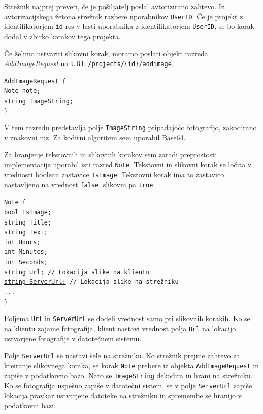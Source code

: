 \documentclass[a4paper, 12pt]{book}
\begin{document}
Strežnik najprej preveri, če je pošiljatelj poslal avtorizirano zahtevo.
Iz avtorizacijskega žetona strežnik razbere uporabnikov \texttt{UserID}. 
Če je projekt z identifikatorjem \texttt{id} res v lasti uporabnika z identifikatorjem \texttt{UserID}, se bo korak dodal v zbirko korakov tega projekta.

Če želimo ustvariti slikovni korak, moramo poslati objekt razreda \textit{AddImageRequest} na URL \texttt{/projects/\{id\}/addimage}.

\noindent \texttt{AddImageRequest \{ \\
Note note; \\
string ImageString;  \\
\} }

V tem razredu predstavlja polje \texttt{ImageString} pripadajočo fotografijo, zakodirano v znakovni niz.
Za kodirni algoritem sem uporabil Base64.

Za hranjenje tekstovnih in slikovnih korakov sem zaradi preprostosti implementacije uporabil isti razred \texttt{Note}.
Tekstovni in slikovni korak se ločita v vrednosti boolean zastavice \texttt{IsImage}.
Tekstovni korak ima to zastavico nastavljeno na vrednost \texttt{false}, slikovni pa \texttt{true}.

\noindent \texttt{Note \{ \\
\underline{bool IsImage;}  \\
string Title; \\
string Text; \\
int Hours; \\
int Minutes; \\
int Seconds; \\
\underline{string Url;} // Lokacija slike na klientu \\
\underline{string ServerUrl;} // Lokacija slike na strežniku \\
... \\
\}
}

Poljema \texttt{Url} in \texttt{ServerUrl} se dodeli vrednost samo pri slikovnih korakih.
Ko se na klientu zajame fotografija, klient nastavi vrednost polja \texttt{Url} na lokacijo ustvarjene fotografije v datotečnem sistemu.

Polje \texttt{ServerUrl} se nastavi šele na strežniku.
Ko strežnik prejme zahtevo za kreiranje slikovnega koraka, se korak \texttt{Note} prebere iz objekta \texttt{AddImageRequest} in zapiše v podatkovno bazo.
Nato se \texttt{ImageString} dekodira in hrani na strežniku.
Ko se fotografija uspešno zapiše v datotečni sistem, se v polje \texttt{ServerUrl} zapiše lokacija pravkar ustvarjene datoteke na strežniku in spremembe se hranijo v podatkovni bazi.
\end{document}
